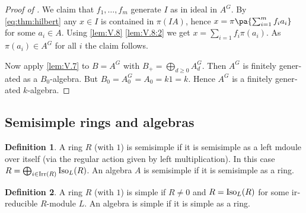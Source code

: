 \documentclass[12pt,a4paper]{scrartcl}
\theoremstyle{cplain}
\theoremstyle{cplain}
\theoremstyle{cplain}
\theoremstyle{definition}
\newtheorem*{deff}{Definition}
\begin{document}
\begin{otherlanguage}{english}
\begin{proof}[Proof of ]
  We claim that $f_1,\ldots,f_m$ generate $I$ as in ideal in $A^G$. By \eqref{eq:thm:hilbert} any $x\in I$ is contained in $\pi(IA)$, hence $x = \pi\pa{\sum_{i=1}^mf_ia_i}$ for some $a_i\in A$. Using \cref{lem:V.8} \ref{lem:V.8:2} we get $x = \sum_{i=1}f_i\pi(a_i)$. As $\pi(a_i)\in A^G$ for all $i$ the claim follows.
  
  Now apply \cref{lem:V.7} to $B = A^G$ with $B_+ = \bigoplus_{d\ge0}A_d^G$. Then $A^G$ is finitely generated as a $B_0$-algebra. But $B_0 = A_0^G =A_0 = k1 = k$. Hence $A^G$ is a finitely generated $k$-algebra.
\end{proof}

\subsection{Semisimple rings and algebras}
\begin{deff}
  A ring $R$ (with $1$) is semisimple if it is semisimple as a left mdoule over itself (via the regular action given by left multiplication). In this case $R=\bigoplus_{i\in \operatorname{Irr}(R)}\operatorname{Iso}_L(R)$. An algebra $A$ is semisimple if it is semisimple as a ring.
\end{deff}

\begin{deff}
  A ring $R$ (with $1$) is simple if $R\neq 0$ and $R=\operatorname{Iso}_L(R)$ for some irreducible $R$-module $L$. An algebra is simple if it is simple as a ring.
\end{deff}




\end{otherlanguage}
\end{document}

